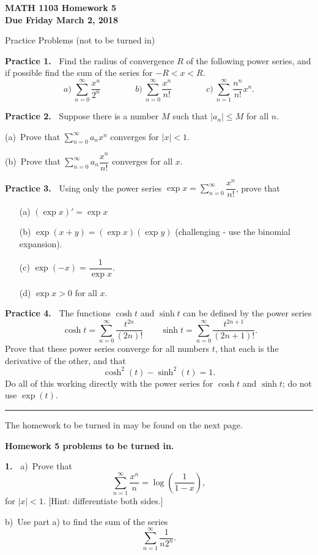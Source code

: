\documentclass[12pt]{article}
\theoremstyle{definition}
\theoremstyle{remark}
\theoremstyle{definition}
\begin{document}
  

{\bf MATH 1103 Homework 5}\\
{\bf Due Friday March 2, 2018}

Practice Problems (not to be turned in)

{\bf Practice 1.\ } Find the radius of convergence $R$ of the following power series, and if possible find the sum of the series for $-R<x<R$. 
\[a)\ \sum\limits_{n=0}^\infty \frac{x^n}{2^n}\qquad\qquad
b)\ \sum\limits_{n=0}^\infty \frac{x^n}{n!}\qquad\qquad
c)\ \sum\limits_{n=1}^\infty \frac{n^n}{n!}x^n.
\]

{\bf Practice 2.\ } Suppose there is a number $M$ such that  $|a_n|\leq M$ for all $n$. 

(a)\ Prove that $\sum\limits_{n=0}^\infty a_n x^n$ converges for $|x|<1$.

(b)\ Prove that $\sum\limits_{n=0}^\infty a_n \dfrac{x^n}{n!}$ converges for all $x$. 

{\bf Practice 3.\ } Using only the power series $\exp x=\sum\limits_{n=0}^\infty\dfrac{x^n}{n!}$, prove that 
\begin{enumerate}
\item[(a)] $(\exp x)'=\exp x$
\item[(b)] $\exp (x+y)=(\exp x)(\exp y)$ (challenging - use the binomial expansion). 
\item[(c)] $\exp(-x)=\dfrac{1}{\exp x}$.
\item[(d)] $\exp x>0$ for all $x$. 
\end{enumerate}

{\bf Practice 4.\ }  The functions $\cosh t$ and $\sinh t$ can be defined by the power series
\[\
\cosh t= \sum_{n=0}^\infty \frac{t^{2n}}{(2n)!}\qquad
\sinh t= \sum_{n=0}^\infty \frac{t^{2n+1}}{(2n+1)!}.
\]
Prove that these power series converge for all numbers $t$,  that each is the derivative of the other, and that 
\[\cosh^2(t)-\sinh^2(t)=1.\]
Do all of this working directly with the power series for $\cosh t$ and $\sinh t$; do not use $\exp(t)$. 

 \rule{\textwidth}{1pt}
The homework to be turned in may be found on the next page.


\newpage

{\bf Homework 5 problems to be turned in.}

{\bf 1.\ } a)\ Prove that 
\[
\sum_{n=1}^\infty\frac{x^n}{n}=\log\left(\frac{1}{1-x}\right), 
\]
for $|x|<1$. 
[Hint: differentiate both sides.]

b)\ Use part a) to find the sum of the series
\[\sum_{n=1}^\infty \frac{1}{n2^n}.\]
\end{document}

